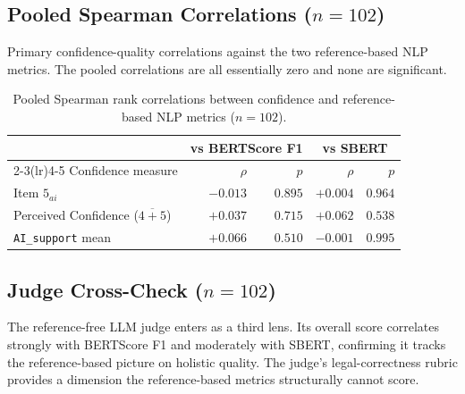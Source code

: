 \subsection{Pooled Spearman Correlations ($n = 102$)}

Primary confidence-quality correlations against the two
reference-based NLP metrics. The pooled correlations are all
essentially zero and none are significant.

\begin{table}[H]
\centering
\small
\begin{tabular}{@{}l r r r r@{}}
\toprule
& \multicolumn{2}{c}{vs BERTScore F1} & \multicolumn{2}{c}{vs SBERT} \\
\cmidrule(lr){2-3}\cmidrule(lr){4-5}
Confidence measure  & $\rho$ & $p$ & $\rho$ & $p$ \\
\midrule
Item $5_{ai}$                              & $-0.013$ & $0.895$ & $+0.004$ & $0.964$ \\
Perceived Confidence ($\overline{4{+}5}$)  & $+0.037$ & $0.715$ & $+0.062$ & $0.538$ \\
\texttt{AI\_support} mean                  & $+0.066$ & $0.510$ & $-0.001$ & $0.995$ \\
\bottomrule
\end{tabular}
\caption{Pooled Spearman rank correlations between confidence and
reference-based NLP metrics ($n = 102$).}
\label{tab:app-corr-pooled}
\end{table}

\subsection{Judge Cross-Check ($n = 102$)}

The reference-free LLM judge enters as a third lens. Its overall
score correlates strongly with BERTScore F1 and moderately with
SBERT, confirming it tracks the reference-based picture on
holistic quality. The judge's legal-correctness rubric provides
a dimension the reference-based metrics structurally cannot
score.

